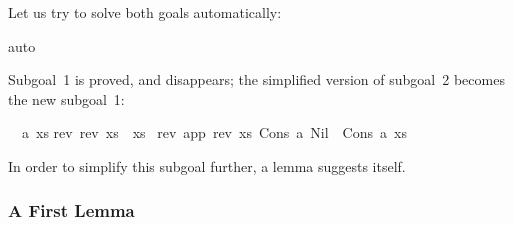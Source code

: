 \begin{isabellebody}
\begin{isamarkuptxt}
\begin{isabelle}
\end{isabelle}
Let us try to solve both goals automatically:%
\end{isamarkuptxt}%
\isamarkuptrue%
\isamarkupfalse%
{}auto{}%
\begin{isamarkuptxt}%
Subgoal~1 is proved, and disappears; the simplified version
of subgoal~2 becomes the new subgoal~1:
\begin{isabelle}%
\ {}{}\ {}a\ xs{}\isanewline
{}rev\ {}rev\ xs{}\ {}\ xs\ {}\isanewline
{}rev\ {}app\ {}rev\ xs{}\ {}Cons\ a\ Nil{}{}\ {}\ Cons\ a\ xs%
\end{isabelle}
In order to simplify this subgoal further, a lemma suggests itself.

\subsubsection{A First Lemma}


\end{isamarkuptxt}
\end{isabellebody}
